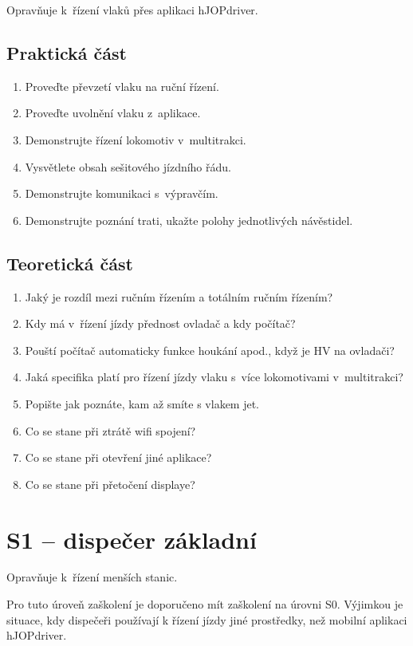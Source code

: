 \documentclass[12pt,a4paper]{article}
\begin{document}
Opravňuje k~řízení vlaků přes aplikaci hJOPdriver.

\subsection*{Praktická část}

\begin{enumerate}[leftmargin=*]
\item Proveďte převzetí vlaku na ruční řízení.
\item Proveďte uvolnění vlaku z~aplikace.
\item Demonstrujte řízení lokomotiv v~multitrakci.
\item Vysvětlete obsah sešitového jízdního řádu.
\item Demonstrujte komunikaci s~výpravčím.
\item Demonstrujte poznání trati, ukažte polohy jednotlivých návěstidel.
\end{enumerate}

\subsection*{Teoretická část}
\begin{enumerate}[leftmargin=*]
\item Jaký je rozdíl mezi ručním řízením a totálním ručním řízením?
\item Kdy má v~řízení jízdy přednost ovladač a kdy počítač?
\item Pouští počítač automaticky funkce houkání apod., když je HV na ovladači?
\item Jaká specifika platí pro řízení jízdy vlaku s~více lokomotivami v~multitrakci?
\item Popište jak poznáte, kam až smíte s vlakem jet.
\item Co se stane při ztrátě wifi spojení?
\item Co se stane při otevření jiné aplikace?
\item Co se stane při přetočení displaye?
\end{enumerate}

\newpage

\section*{S1 – dispečer základní}

Opravňuje k~řízení menších stanic.

Pro tuto úroveň zaškolení je doporučeno mít zaškolení na úrovni S0. Výjimkou
je situace, kdy dispečeři používají k řízení jízdy jiné prostředky, než mobilní
aplikaci hJOPdriver.
\end{document}
